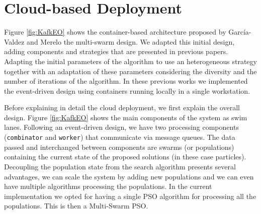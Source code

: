 \documentclass{cys}
\begin{document}
\section{Cloud-based Deployment}
\label{sec:aws-deployment}


Figure \ref{fig:KafkEO} shows the container-based architecture proposed by García-Valdez and
Merelo \cite{valdez2021container,garcia2018modern} the multi-swarm design. We adapted this initial
design, adding components and strategies that are presented in previous papers. Adapting the 
initial parameters of the algorithm to use an heterogeneous strategy \cite{mancilla2024pendiente} 
together with an adaptation of these parameters considering the diversity and the number of iterations of the algorithm. 
In these previous works we implemented the event-driven design using containers running 
locally in a single workstation.

Before explaining in detail the cloud deployment, we first explain the overall design. 
Figure \ref{fig:KafkEO} shows the main components of the system as swim lanes. 
Following an event-driven design, we have two processing components (\texttt{combinator} and \texttt{worker}) that communicate via message queues.  
The data passed and interchanged between components are swarms (or populations) containing 
the current state of the proposed solutions (in these case particles). Decoupling the 
population state from the search algorithm presents several advantages, we can scale 
the system by adding new populations and we can even have multiple algorithms processing 
the populations. In the current implementation we opted for having a single PSO algorithm 
for processing all the populations. This is then a Multi-Swarm PSO.
\end{document}
